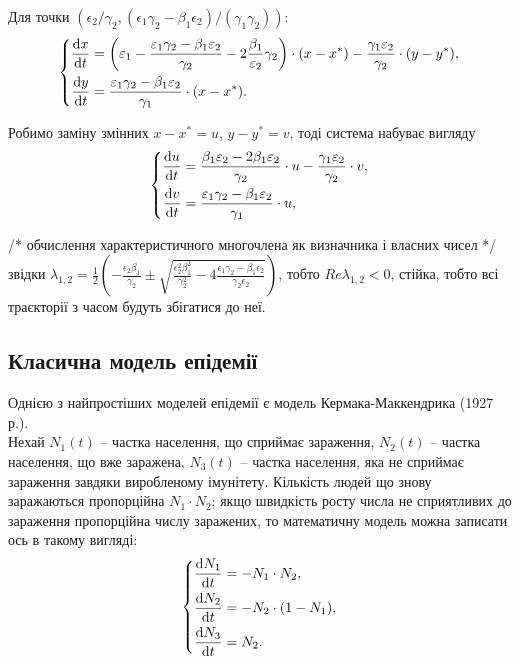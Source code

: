 Для точки $(\epsilon_2 / \gamma_2, (\epsilon_1 \gamma_2 - \beta_1 \epsilon_2) / (\gamma_1 \gamma_2))$:
\begin{equation}
    \left\{
    \begin{aligned}
    \frac{\mathop{}\!\mathrm{d} x}{\mathop{}\!\mathrm{d} t} &= \left( \varepsilon_1 - \frac{\varepsilon_1 \gamma_2 - \beta_1 \varepsilon_2}{\gamma_2} - 2 \frac{\beta_1}{\varepsilon_2}{\gamma_2} \right) \cdot (x - x^*) - \frac{\gamma_1 \varepsilon_2}{\gamma_2} \cdot (y - y^*), \\
    \frac{\mathop{}\!\mathrm{d} y}{\mathop{}\!\mathrm{d} t} &= \frac{\varepsilon_1 \gamma_2 - \beta_1 \varepsilon_2}{\gamma_1} \cdot (x - x^*) .
\end{aligned}
\right.
\end{equation}

Робимо заміну змінних $x - x^* = u$, $y - y^* = v$, тоді система набуває вигляду
\begin{equation}
    \left\{
    \begin{aligned}
    \frac{\mathop{}\!\mathrm{d} u}{\mathop{}\!\mathrm{d} t} &= \frac{\beta_1 \varepsilon_2 - 2 \beta_1 \varepsilon_2}{\gamma_2} \cdot u - \frac{\gamma_1 \varepsilon_2}{\gamma_2} \cdot v, \\
    \frac{\mathop{}\!\mathrm{d} v}{\mathop{}\!\mathrm{d} t} &= \frac{\varepsilon_1 \gamma_2 - \beta_1 \varepsilon_2}{\gamma_1} \cdot u,
\end{aligned}
\right.
\end{equation}

/* обчислення характеристичного многочлена як визначника і власних чисел */ \\

звідки $\lambda_{1,2} = \frac12 \left( - \frac{\epsilon_2 \beta_1}{\gamma_2} \pm \sqrt{\frac{\epsilon_2^2 \beta_1^2}{\gamma_2^2} - 4 \frac{\epsilon_1 \gamma_2 - \beta_1 \epsilon_2}{\gamma_2 \epsilon_2} } \right)$, тобто $Re \lambda_{1, 2} < 0$, стійка, тобто всі траєкторії з часом будуть збігатися до неї.

\subsection{Класична модель епідемії}

Однією з найпростіших моделей епідемії є модель Кермака-Маккендрика (1927 р.). \\

Нехай $N_1(t)$ -- частка населення, що сприймає зараження, $N_2(t)$ -- частка населення, що вже заражена, $N_3(t)$ -- частка населення, яка не сприймає зараження завдяки виробленому імунітету. Кількість людей що знову заражаються пропорційна $N_1 \cdot N_2$; якщо швидкість росту числа не сприятливих до зараження пропорційна числу заражених, то математичну модель можна записати ось в такому вигляді:
\begin{equation}
    \label{eq:2.4}
    \left\{
        \begin{aligned}
            \frac{\mathop{}\!\mathrm{d} N_1}{\mathop{}\!\mathrm{d} t} &= - N_1 \cdot N_2, \\
            \frac{\mathop{}\!\mathrm{d} N_2}{\mathop{}\!\mathrm{d} t} &= - N_2 \cdot (1 - N_1), \\
            \frac{\mathop{}\!\mathrm{d} N_3}{\mathop{}\!\mathrm{d} t} &= N_2.
        \end{aligned}
    \right.
\end{equation}

